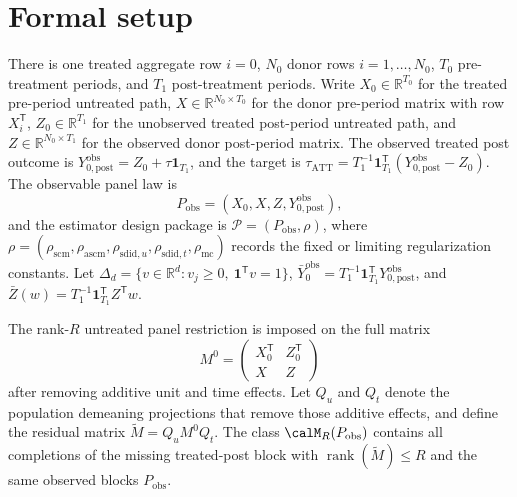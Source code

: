 \documentclass[11pt]{article}
\newcommand{\one}{\mathbf{1}}
\newcommand{\transpose}{\mathsf{T}}
\newcommand{\R}{\mathbb{R}}
\theoremstyle{definition}
\theoremstyle{plain}
\theoremstyle{remark}
\begin{document}
\section{Formal setup}

There is one treated aggregate row \(i=0\), \(N_0\) donor rows \(i=1,\ldots,N_0\), \(T_0\) pre-treatment periods, and \(T_1\) post-treatment periods. Write \(X_0\in\R^{T_0}\) for the treated pre-period untreated path, \(X\in\R^{N_0\times T_0}\) for the donor pre-period matrix with row \(X_i^\transpose\), \(Z_0\in\R^{T_1}\) for the unobserved treated post-period untreated path, and \(Z\in\R^{N_0\times T_1}\) for the observed donor post-period matrix. The observed treated post outcome is \(Y^{\mathrm{obs}}_{0,\mathrm{post}}=Z_0+\tau\one_{T_1}\), and the target is \(\tau_{\mathrm{ATT}}=T_1^{-1}\one_{T_1}^\transpose(Y^{\mathrm{obs}}_{0,\mathrm{post}}-Z_0)\). The observable panel law is
\[
P_{\mathrm{obs}}=(X_0,X,Z,Y^{\mathrm{obs}}_{0,\mathrm{post}}),
\]
and the estimator design package is \(\mathcal P=(P_{\mathrm{obs}},\rho)\), where \(\rho=(\rho_{\mathrm{scm}},\rho_{\mathrm{ascm}},\rho_{\mathrm{sdid},u},\rho_{\mathrm{sdid},t},\rho_{\mathrm{mc}})\) records the fixed or limiting regularization constants. Let \(\Delta_d=\{v\in\R^d:v_j\ge0,\ \one^\transpose v=1\}\), \(\bar Y^{\mathrm{obs}}_0=T_1^{-1}\one_{T_1}^\transpose Y^{\mathrm{obs}}_{0,\mathrm{post}}\), and \(\bar Z(w)=T_1^{-1}\one_{T_1}^\transpose Z^\transpose w\).

The rank-\(R\) untreated panel restriction is imposed on the full matrix
\[
M^0=\begin{pmatrix}
X_0^\transpose & Z_0^\transpose\\
X & Z
\end{pmatrix}
\]
after removing additive unit and time effects. Let \(Q_u\) and \(Q_t\) denote the population demeaning projections that remove those additive effects, and define the residual matrix \(\widetilde M=Q_uM^0Q_t\). The class \(\calM_R(P_{\mathrm{obs}})\) contains all completions of the missing treated-post block with \(\operatorname{rank}(\widetilde M)\le R\) and the same observed blocks \(P_{\mathrm{obs}}\).
\end{document}

